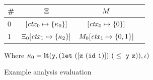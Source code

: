 \begin{figure}
\begin{minipage}{0.43\linewidth}
\begin{center}
{\begin{tabular}{|l|c|}
          \hline
        \end{tabular}}
      \\[10pt]
      {\small
        \begin{tabular}{|l|c|c|c|}
          \hline
          \# & $\Xi$ & $M$ \\
          \hline
          0  & $[\mathit{ctx}_0 \mapsto \{ \kappa_0 \}]$ & $[\mathit{ctx}_0 \mapsto \{ 0 \}]$ \\
          1  & $\Xi_0[\mathit{ctx}_1 \mapsto \{ \kappa_2 \}]$ & $M_0[\mathit{ctx}_1 \mapsto \{ 0,1 \}]$ \\
          \hline
        \end{tabular}}    
    \end{center}
  \end{minipage}
Where $\kappa_0 = \mathbf{lt}({\tt y}, {\tt (let\ ([z\ (id\ 1)])\ (}\le\ {\tt y}\ {\tt z))}, \iota)$
\caption{Example analysis evaluation}
\label{fig:ex-eval}
\end{figure}

